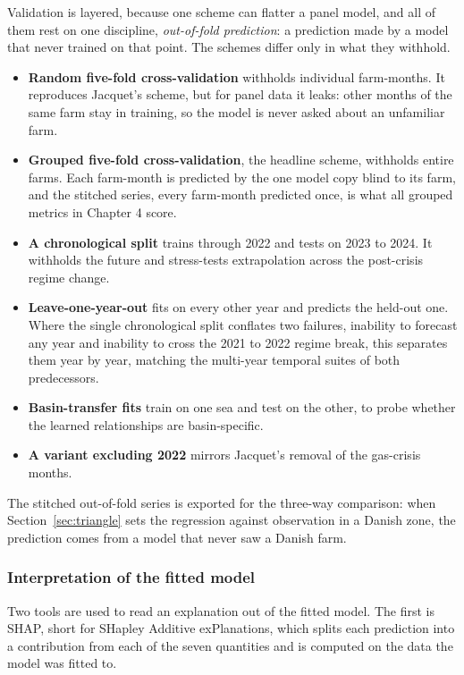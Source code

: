 Validation is layered, because one scheme can flatter a panel model, and
all of them rest on one discipline, \textit{out-of-fold prediction}: a
prediction made by a model that never trained on that point. The schemes
differ only in what they withhold.

\begin{itemize}
    \item \textbf{Random five-fold cross-validation} withholds individual
    farm-months. It reproduces Jacquet's scheme, but for panel data it leaks:
    other months of the same farm stay in training, so the model is never asked
    about an unfamiliar farm.
    \item \textbf{Grouped five-fold cross-validation}, the headline scheme,
    withholds entire farms. Each farm-month is predicted by the one model copy
    blind to its farm, and the stitched series, every farm-month predicted once,
    is what all grouped metrics in Chapter 4 score.
    \item \textbf{A chronological split} trains through 2022 and tests on 2023 to
    2024. It withholds the future and stress-tests extrapolation across the
    post-crisis regime change.
    \item \textbf{Leave-one-year-out} fits on every other year and predicts the
    held-out one. Where the single chronological split conflates two failures,
    inability to forecast any year and inability to cross the 2021 to 2022 regime
    break, this separates them year by year, matching the multi-year temporal
    suites of both predecessors.
    \item \textbf{Basin-transfer fits} train on one sea and test on the other, to
    probe whether the learned relationships are basin-specific.
    \item \textbf{A variant excluding 2022} mirrors Jacquet's removal of the
    gas-crisis months.
\end{itemize}

The stitched out-of-fold series is exported for the three-way comparison: when
Section~\ref{sec:triangle} sets the regression against observation in a Danish
zone, the prediction comes from a model that never saw a Danish farm.

\subsubsection{Interpretation of the fitted model}\label{sec:mechanism_tools}

Two tools are used to read an explanation out of the fitted model. The first is
SHAP, short for SHapley Additive exPlanations, which splits each prediction into
a contribution from each of the seven quantities and is computed on the data the
model was fitted to.

